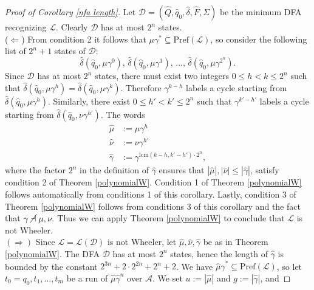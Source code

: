 \documentclass[runningheads]{llncs}
\newcommand{\pf}[1]{\text{Pref}(\mathcal #1)}
\newcommand{\ndashv}{\;\cancel\dashv\;}
\newcommand{\la}[1]{\mathcal L(\mathcal #1)}
\begin{document}
\begin{proof}[Proof of Corollary \ref{nfa length}]
Let $\mathcal D = (\hat Q, \hat q_0, \hat \delta, \hat F, \Sigma)$ be the minimum DFA recognizing $\mathcal L$. Clearly $\mathcal D$ has at most $2^n$ states.
\\($\Longleftarrow$) From condition 2 it follows that $\mu\gamma^* \subseteq \pf L$, so consider the following list of $2^n+1$ states of $\mathcal D$:
\[
\hat\delta(\hat q_0, \mu\gamma^0), \, \hat\delta(\hat q_0, \mu\gamma^1), \, \dots, \, \hat\delta(\hat q_0, \mu\gamma^{2^n}).
\]
Since $\mathcal D$ has at most $2^n$ states, there must exist two integers $0 \le h < k \le 2^n$ such that $\hat\delta(\hat q_0, \mu\gamma^h) = \hat\delta(\hat q_0, \mu\gamma^k)$. Therefore $\gamma^{k-h}$ labels a cycle starting from $\hat\delta(\hat q_0, \mu\gamma^h)$. Similarly, there exist $0 \le h' < k' \le 2^n$ such that $\gamma^{k'-h'}$ labels a cycle starting from $\hat\delta(\hat q_0, \nu\gamma^{h'})$. The words 
\begin{align*}
\hat\mu &:= \mu \gamma^{h} \\
\hat\nu &:= \nu \gamma^{h'} \\
\hat\gamma &:= \gamma^{\text{lcm}(k-h, k'-h')\cdot 2^n},
\end{align*}
where the factor $2^n$ in the definition of $\hat\gamma$ ensures that $|\hat\mu|, |\hat\nu| \le |\hat\gamma|$, satisfy condition 2 of Theorem \ref{polynomialW}. 
Condition 1 of Theorem \ref{polynomialW} follows automatically from conditions 1 of this corollary. Lastly, condition 3 of Theorem \ref{polynomialW} follows from conditions 3 of this corollary and the fact that $\gamma \ndashv \mu, \nu.$
Thus we can apply Theorem \ref{polynomialW} to conclude that $\mathcal L$ is not Wheeler.
\\$(\Longrightarrow)$
Since $\mathcal L = \la D$ is not Wheeler, let $\hat\mu, \hat\nu, \hat\gamma$ be as in Theorem \ref{polynomialW}. The DFA $\mathcal D$ has at most $2^n$ states, hence the length of $\hat\gamma$ is bounded by the constant $2^{3n}+2\cdot 2^{2n}+2^n+2$. %
We have $\hat\mu\hat\gamma^* \subseteq \pf L$, so let $t_0 = q_0, t_1, \dots, t_m$ be a run of $\hat\mu\hat\gamma^n$ over $\mathcal A$. We set $u := |\hat\mu|$ and $g := |\hat\gamma|$, and %

\end{proof}
\end{document}
